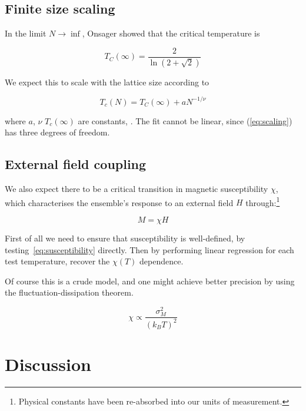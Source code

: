 \documentclass[12pt]{article}
\begin{document}
\subsection{Finite size scaling}\label{sec:scaling}

In the limit \(N \rightarrow \inf \), Onsager showed that the critical temperature is

\begin{equation}\label{eq:onsager}
  T_C (\infty)= \frac{2}{\ln(2 + \sqrt{2})}
\end{equation}

We expect this to scale with the lattice size according to

\begin{equation}\label{eq:scaling}
  T_c(N) = T_C(\infty) + a N ^{-1/\nu}
\end{equation}

where \(a\), \(\nu\) \(T_c(\infty)\) are constants, . The fit cannot be linear, since (\ref{eq:scaling}) has three degrees of freedom. 

\subsection{External field coupling}\label{sec:chi}

We also expect there to be a critical transition in magnetic susceptibility \(\chi \), which characterises the ensemble's response to an external field \(H\) through:\footnote{Physical constants have been re-absorbed into our units of measurement. }

\begin{equation}\label{eq:susceptibility}
  M = \chi H
\end{equation}

First of all we need to ensure that susceptibility is well-defined, by testing~\eqref{eq:susceptibility} directly. Then by performing linear regression for each test temperature, recover the \(\chi(T)\) dependence.

Of course this is a crude model, and one might achieve better precision by using the fluctuation-dissipation theorem.

\begin{equation}\label{eq:fluctuation-dissipation-magnetisation}
 \chi \propto \frac{\sigma_M^2}{ {(k_B T)}^2}
\end{equation}

\section{Discussion}\label{sec:discussion}
\end{document}
